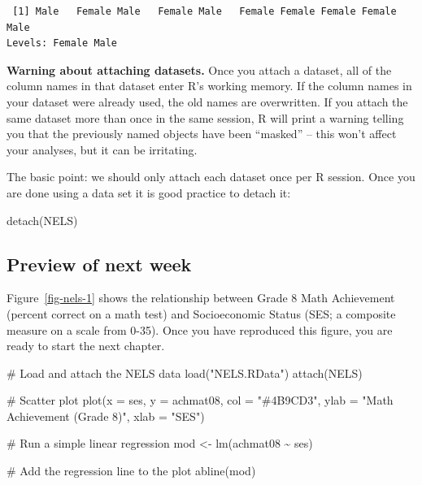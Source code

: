 \documentclass[
  letterpaper,
  DIV=11,
  numbers=noendperiod]{scrreprt}
\newenvironment{Shaded}{\begin{snugshade}}{\end{snugshade}}
\newcommand{\AttributeTok}[1]{\textcolor[rgb]{0.40,0.45,0.13}{#1}}
\newcommand{\CommentTok}[1]{\textcolor[rgb]{0.37,0.37,0.37}{#1}}
\newcommand{\FunctionTok}[1]{\textcolor[rgb]{0.28,0.35,0.67}{#1}}
\newcommand{\NormalTok}[1]{\textcolor[rgb]{0.00,0.23,0.31}{#1}}
\newcommand{\OtherTok}[1]{\textcolor[rgb]{0.00,0.23,0.31}{#1}}
\newcommand{\SpecialCharTok}[1]{\textcolor[rgb]{0.37,0.37,0.37}{#1}}
\newcommand{\StringTok}[1]{\textcolor[rgb]{0.13,0.47,0.30}{#1}}
\begin{document}
\begin{verbatim}
 [1] Male   Female Male   Female Male   Female Female Female Female Male  
Levels: Female Male
\end{verbatim}

\textbf{Warning about attaching datasets.} Once you attach a dataset,
all of the column names in that dataset enter R's working memory. If the
column names in your dataset were already used, the old names are
overwritten. If you attach the same dataset more than once in the same
session, R will print a warning telling you that the previously named
objects have been ``masked'' -- this won't affect your analyses, but it
can be irritating.

The basic point: we should only attach each dataset once per R session.
Once you are done using a data set it is good practice to detach it:

\begin{Shaded}
\begin{Highlighting}[]
\FunctionTok{detach}\NormalTok{(NELS)}
\end{Highlighting}
\end{Shaded}

\hypertarget{preview-of-next-week}{%
\subsection{Preview of next week}\label{preview-of-next-week}}

Figure~\ref{fig-nels-1} shows the relationship between Grade 8 Math
Achievement (percent correct on a math test) and Socioeconomic Status
(SES; a composite measure on a scale from 0-35). Once you have
reproduced this figure, you are ready to start the next chapter.

\begin{Shaded}
\begin{Highlighting}[]
\CommentTok{\# Load and attach the NELS data}
\FunctionTok{load}\NormalTok{(}\StringTok{"NELS.RData"}\NormalTok{)}
\FunctionTok{attach}\NormalTok{(NELS)}

\CommentTok{\# Scatter plot}
\FunctionTok{plot}\NormalTok{(}\AttributeTok{x =}\NormalTok{ ses, }
     \AttributeTok{y =}\NormalTok{ achmat08, }
     \AttributeTok{col =} \StringTok{"\#4B9CD3"}\NormalTok{, }
     \AttributeTok{ylab =} \StringTok{"Math Achievement (Grade 8)"}\NormalTok{, }
     \AttributeTok{xlab =} \StringTok{"SES"}\NormalTok{)}

\CommentTok{\# Run a simple linear regression }
\NormalTok{mod }\OtherTok{\textless{}{-}} \FunctionTok{lm}\NormalTok{(achmat08 }\SpecialCharTok{\textasciitilde{}}\NormalTok{ ses)}

\CommentTok{\# Add the regression line to the plot}
\FunctionTok{abline}\NormalTok{(mod) }
\end{Highlighting}
\end{Shaded}
\end{document}
